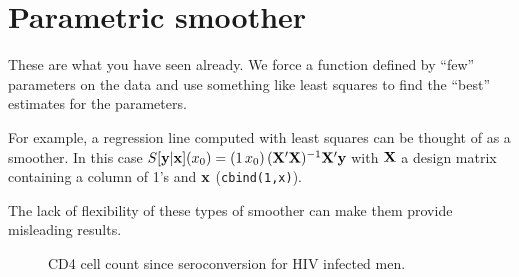 \section{Parametric smoother}
These are what you have seen already. We force a function defined by
``few'' parameters on the data and use something like least squares to
find the ``best'' estimates for the parameters. 

For example, a regression line computed with least squares can be
thought of as a smoother. In this case $S[{\mathbf y}|{\mathbf x}](x_0) =
(1 \, x_0) \, ({\mathbf X}'{\mathbf X})^{-1}{\mathbf X}'{\mathbf y}$ with ${\mathbf X}$ a design matrix containing a
column of 1's and ${\mathbf x}$ ({\tt cbind(1,x)}).
 

The lack of flexibility of these types of smoother can make them
provide misleading results.


\begin{figure}[htp]
\caption{\label{f2.2} CD4 cell count since seroconversion for HIV infected men.}
\centerline{}
\end{figure}
